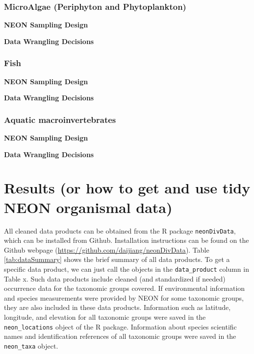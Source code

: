 \documentclass[
  12pt,
]{article}
\begin{document}
\hypertarget{microalgae-periphyton-and-phytoplankton}{%
\subsubsection{MicroAlgae (Periphyton and Phytoplankton)}\label{microalgae-periphyton-and-phytoplankton}}

\textbf{NEON Sampling Design}

\textbf{Data Wrangling Decisions}

\hypertarget{fish}{%
\subsubsection{Fish}\label{fish}}

\textbf{NEON Sampling Design}

\textbf{Data Wrangling Decisions}

\hypertarget{aquatic-macroinvertebrates}{%
\subsubsection{Aquatic macroinvertebrates}\label{aquatic-macroinvertebrates}}

\textbf{NEON Sampling Design}

\textbf{Data Wrangling Decisions}

\hypertarget{results-or-how-to-get-and-use-tidy-neon-organismal-data}{%
\section{Results (or how to get and use tidy NEON organismal data)}\label{results-or-how-to-get-and-use-tidy-neon-organismal-data}}

All cleaned data products can be obtained from the R package \texttt{neonDivData}, which can be installed from Github. Installation instructions can be found on the Github webpage (\url{https://github.com/daijiang/neonDivData}). Table \ref{tab:dataSummary} shows the brief summary of all data products. To get a specific data product, we can just call the objects in the \texttt{data\_product} column in Table x. Such data products include cleaned (and standardized if needed) occurrence data for the taxonomic groups covered. If environmental information and species measurements were provided by NEON for some taxonomic groups, they are also included in these data products. Information such as latitude, longitude, and elevation for all taxonomic groups were saved in the \texttt{neon\_locations} object of the R package. Information about species scientific names and identification references of all taxonomic groups were saved in the \texttt{neon\_taxa} object.
\end{document}
